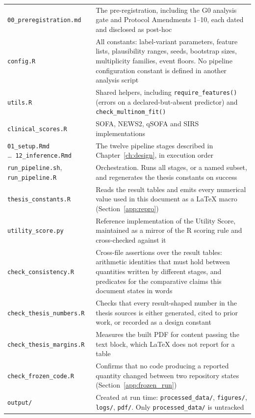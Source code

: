 {\begin{longtable}{p{4.6cm}p{8.4cm}}
        \texttt{00\_preregistration.md} &
        The pre-registration, including the G0 analysis gate and Protocol
        Amendments 1--10, each dated and disclosed as post-hoc \\
        \addlinespace
        \texttt{config.R} &
        All constants: label-variant parameters, feature lists, plausibility
        ranges, seeds, bootstrap sizes, multiplicity families, event floors.
        No pipeline configuration constant is defined in another analysis
        script \\
        \addlinespace
        \texttt{utils.R} &
        Shared helpers, including \texttt{require\_features()} (errors on a
        declared-but-absent predictor) and \texttt{check\_multinom\_fit()} \\
        \addlinespace
        \texttt{clinical\_scores.R} &
        SOFA, NEWS2, qSOFA and SIRS implementations \\
        \addlinespace
        \texttt{01\_setup.Rmd} \dots\ \texttt{12\_inference.Rmd} &
        The twelve pipeline stages described in Chapter~\ref{ch:design}, in
        execution order \\
        \addlinespace
        \texttt{run\_pipeline.sh}, \texttt{run\_pipeline.R} &
        Orchestration. Runs all stages, or a named subset, and regenerates the
        thesis constants on success \\
        \addlinespace
        \texttt{thesis\_constants.R} &
        Reads the result tables and emits every numerical value used in this
        document as a \LaTeX{} macro (Section~\ref{app:repro}) \\
        \addlinespace
        \texttt{utility\_score.py} &
        Reference implementation of the Utility Score, maintained as a mirror
        of the R scoring rule and cross-checked against it \\
        \addlinespace
        \texttt{check\_consistency.R} &
        Cross-file assertions over the result tables: arithmetic identities
        that must hold between quantities written by different stages, and
        predicates for the comparative claims this document states in words \\
        \addlinespace
        \texttt{check\_thesis\_numbers.R} &
        Checks that every result-shaped number in the thesis sources is either
        generated, cited to prior work, or recorded as a design constant \\
        \addlinespace
        \texttt{check\_thesis\_margins.R} &
        Measures the built PDF for content passing the text block, which
        \LaTeX{} does not report for a table \\
        \addlinespace
        \texttt{check\_frozen\_code.R} &
        Confirms that no code producing a reported quantity changed between two
        repository states
        (Section~\ref{app:frozen_run}) \\
        \addlinespace
        \texttt{output/} &
        Created at run time: \texttt{processed\_data/}, \texttt{figures/},
        \texttt{logs/}, \texttt{pdf/}. Only \texttt{processed\_data/} is
        untracked \\
\end{longtable}
}

